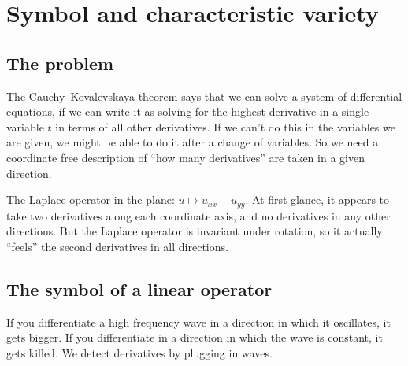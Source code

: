 \chapter{Symbol and characteristic variety}\label{chapter:characteristics}%
\section{The problem}
The Cauchy--Kovalevskaya theorem says that we can solve a system of differential equations, if we can write it as solving for the highest derivative in a single variable \(t\) in terms of all other derivatives.
If we can't do this in the variables we are given, we might be able to do it after a change of variables. 
So we need a coordinate free description of ``how many derivatives'' are taken in a given direction.
\begin{example}The Laplace operator in the plane: \(u \mapsto u_{xx}+u_{yy}\).
At first glance, it appears to take two derivatives along each coordinate axis, and no derivatives in any other directions.
But the Laplace operator is invariant under rotation, so it actually ``feels'' the second derivatives in all directions.
\end{example}

\section{The symbol of a linear operator}
If you differentiate a high frequency wave in a direction in which it oscillates, it gets bigger.
If you differentiate in a direction in which the wave is constant, it gets killed.
We detect derivatives by plugging in waves.

